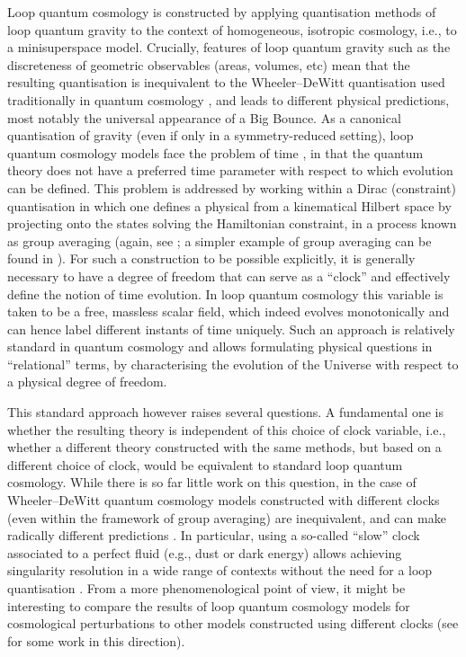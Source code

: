 \documentclass[aps,prd,11pt,showkeys,nofootinbib]{revtex4-2}
\begin{document}
Loop quantum cosmology \cite{Ashtekar:2011ni} is constructed by applying quantisation methods of loop quantum gravity \cite{Ashtekar:2004eh} to the context of homogeneous, isotropic cosmology, i.e., to a minisuperspace model. Crucially, features of loop quantum gravity such as the discreteness of geometric observables (areas, volumes, etc) mean that the resulting quantisation is inequivalent to the Wheeler--DeWitt quantisation used traditionally in quantum cosmology \cite{Misner:1969ae,GIELEN2025520}, and leads to different physical predictions, most notably the universal appearance of a Big Bounce. As a canonical quantisation of gravity (even if only in a symmetry-reduced setting), loop quantum cosmology models face the problem of time \cite{Isham:1992ms}, in that the quantum theory does not have a preferred time parameter with respect to which evolution can be defined. This problem is addressed by working within a Dirac (constraint) quantisation in which one defines a physical from a kinematical Hilbert space by projecting onto the states solving the Hamiltonian constraint, in a process known as group averaging (again, see \cite{Ashtekar:2011ni}; a simpler example of group averaging can be found in \cite{Hohn:2018iwn}). For such a construction to be possible explicitly, it is generally necessary to have a degree of freedom that can serve as a ``clock'' and effectively define the notion of time evolution. In loop quantum cosmology this variable is taken to be a free, massless scalar field, which indeed evolves monotonically and can hence label different instants of time uniquely. Such an approach is relatively standard in quantum cosmology and allows formulating physical questions in ``relational'' terms, by characterising the evolution of the Universe with respect to a physical degree of freedom.

This standard approach however raises several questions. A fundamental one is whether the resulting theory is independent of this choice of clock variable, i.e., whether a different theory constructed with the same methods, but based on a different choice of clock, would be equivalent to standard loop quantum cosmology. While there is so far little work on this question, in the case of Wheeler--DeWitt quantum cosmology models constructed with different clocks (even within the framework of group averaging) are inequivalent, and can make radically different predictions \cite{Gielen:2020abd}. In particular, using a so-called ``slow'' clock associated to a perfect fluid (e.g., dust or dark energy) allows achieving singularity resolution in a wide range of contexts without the need for a loop quantisation \cite{Gryb:2018whn,Gielen:2022tzi,Gielen:2024lpm,Gielen:2025ovv}. From a more phenomenological point of view, it might be interesting to compare the results of loop quantum cosmology models for cosmological perturbations to other models constructed using different clocks (see \cite{Giesel:2020raf} for some work in this direction).
\end{document}
